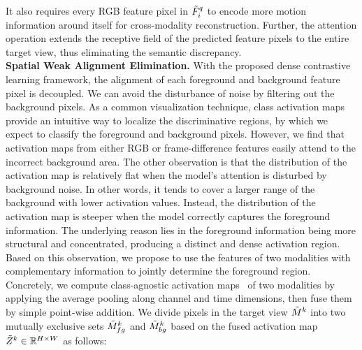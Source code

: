 \documentclass[sigconf,screen]{acmart}
\begin{document}
It also requires every RGB feature pixel in $\Tilde{F}_i^q$ to encode more motion information around itself for cross-modality reconstruction. Further, the attention operation extends the receptive field of the predicted feature pixels to the entire target view, thus eliminating the semantic discrepancy. \\
{\bf Spatial Weak Alignment Elimination.} 
With the proposed dense contrastive learning framework, the alignment of each foreground and background feature pixel is decoupled. We can avoid the disturbance of noise by filtering out the background pixels.
As a common visualization technique, class activation maps~\cite{CAAM,CAM} provide an intuitive way to localize the discriminative regions, by which we expect to classify the foreground and background pixels.
However, we find that activation maps from either RGB or frame-difference features easily attend to the incorrect background area. 
The other observation is that the distribution of the activation map is relatively flat when the model's attention is disturbed by background noise. In other words, it tends to cover a larger range of the background with lower activation values. Instead, the distribution of the activation map is steeper when the model correctly captures the foreground information. The underlying reason lies in the foreground information being more structural and concentrated, producing a distinct and dense activation region. 
Based on this observation, we propose to use the features of two modalities with complementary information to jointly determine the foreground region.
Concretely, we compute class-agnostic activation maps~\cite{CAAM} of two modalities by applying the average pooling along channel and time dimensions, then fuse them by simple point-wise addition. We divide pixels in the target view $\Tilde{M}^k$ into two mutually exclusive sets $\Tilde{M}_{fg}^k$ and $\Tilde{M}_{bg}^k$ based on the fused activation map $\Tilde{Z}^k \in \mathbb{R}^{H \times W}$ as follows: 
\end{document}
